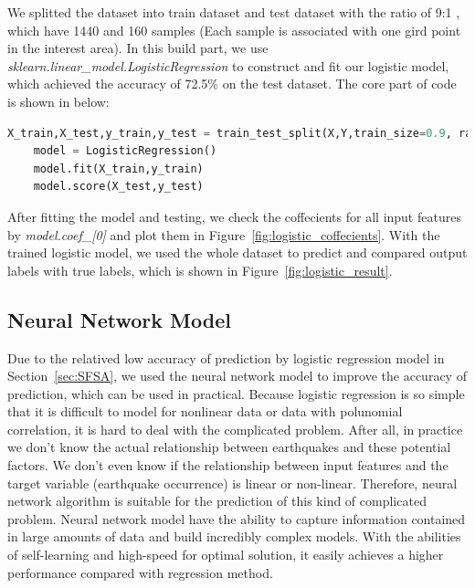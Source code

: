 \documentclass[final-report]{report-template}
\begin{document}
We splitted the dataset into train dataset and test dataset with the ratio of 9:1 , which have 1440 and 160 samples (Each sample is associated with one gird point in the interest area). In this build part, we use \textit{sklearn.linear\_model.LogisticRegression} to construct and fit our logistic model, which achieved the accuracy of 72.5\% on the test dataset.
The core part of code is shown in below:
\begin{lstlisting}[language=Python]
    X_train,X_test,y_train,y_test = train_test_split(X,Y,train_size=0.9, random_state=42)
    model = LogisticRegression()
    model.fit(X_train,y_train)
    model.score(X_test,y_test)
\end{lstlisting}
After fitting the model and testing, we check the coffecients for all input features by \textit{model.coef\_[0]} and plot them in Figure~\ref{fig:logistic_coffecients}. With the trained logistic model, we used the whole dataset to predict and compared output labels with true labels, which is shown in Figure~\ref{fig:logistic_result}.

\subsection{Neural Network Model}
\label{sec:NNM}
Due to the relatived low accuracy of prediction by logistic regression model in Section~\ref{sec:SFSA}, we used the neural network model to improve the accuracy of prediction, which can be used in practical. 
Because logistic regression is so simple that it is difficult to model for nonlinear data or data with polunomial correlation, it is hard to deal with the complicated problem. 
After all, in practice we don't know the actual relationship between earthquakes and these potential factors.
We don't even know if the relationship between input features and the target variable (earthquake occurrence) is linear or non-linear.
Therefore, neural network algorithm is suitable for the prediction of this kind of complicated problem. Neural network model have the ability to capture information contained in large amounts of data and build incredibly complex models. With the abilities of self-learning and high-speed for optimal solution, it easily achieves a higher performance compared with regression method.
\end{document}
